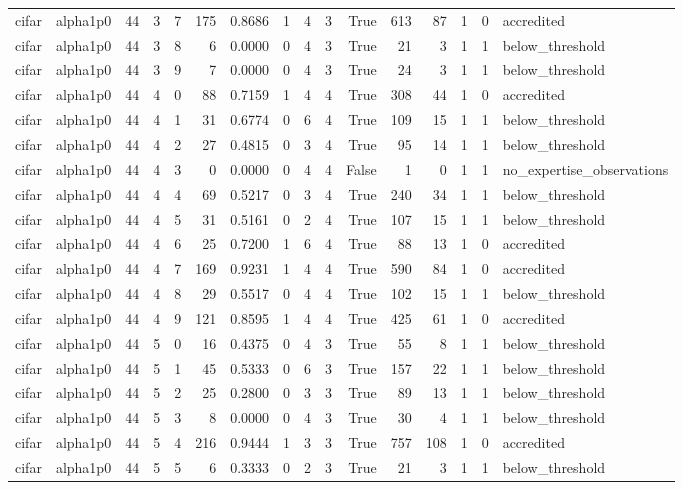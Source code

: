 \begin{tabular}{llrrrrrrrrrrrrrl}
cifar & alpha1p0 & 44 & 3 & 7 & 175 & 0.8686 & 1 & 4 & 3 & True & 613 & 87 & 1 & 0 & accredited \\
cifar & alpha1p0 & 44 & 3 & 8 & 6 & 0.0000 & 0 & 4 & 3 & True & 21 & 3 & 1 & 1 & below\_threshold \\
cifar & alpha1p0 & 44 & 3 & 9 & 7 & 0.0000 & 0 & 4 & 3 & True & 24 & 3 & 1 & 1 & below\_threshold \\
cifar & alpha1p0 & 44 & 4 & 0 & 88 & 0.7159 & 1 & 4 & 4 & True & 308 & 44 & 1 & 0 & accredited \\
cifar & alpha1p0 & 44 & 4 & 1 & 31 & 0.6774 & 0 & 6 & 4 & True & 109 & 15 & 1 & 1 & below\_threshold \\
cifar & alpha1p0 & 44 & 4 & 2 & 27 & 0.4815 & 0 & 3 & 4 & True & 95 & 14 & 1 & 1 & below\_threshold \\
cifar & alpha1p0 & 44 & 4 & 3 & 0 & 0.0000 & 0 & 4 & 4 & False & 1 & 0 & 1 & 1 & no\_expertise\_observations \\
cifar & alpha1p0 & 44 & 4 & 4 & 69 & 0.5217 & 0 & 3 & 4 & True & 240 & 34 & 1 & 1 & below\_threshold \\
cifar & alpha1p0 & 44 & 4 & 5 & 31 & 0.5161 & 0 & 2 & 4 & True & 107 & 15 & 1 & 1 & below\_threshold \\
cifar & alpha1p0 & 44 & 4 & 6 & 25 & 0.7200 & 1 & 6 & 4 & True & 88 & 13 & 1 & 0 & accredited \\
cifar & alpha1p0 & 44 & 4 & 7 & 169 & 0.9231 & 1 & 4 & 4 & True & 590 & 84 & 1 & 0 & accredited \\
cifar & alpha1p0 & 44 & 4 & 8 & 29 & 0.5517 & 0 & 4 & 4 & True & 102 & 15 & 1 & 1 & below\_threshold \\
cifar & alpha1p0 & 44 & 4 & 9 & 121 & 0.8595 & 1 & 4 & 4 & True & 425 & 61 & 1 & 0 & accredited \\
cifar & alpha1p0 & 44 & 5 & 0 & 16 & 0.4375 & 0 & 4 & 3 & True & 55 & 8 & 1 & 1 & below\_threshold \\
cifar & alpha1p0 & 44 & 5 & 1 & 45 & 0.5333 & 0 & 6 & 3 & True & 157 & 22 & 1 & 1 & below\_threshold \\
cifar & alpha1p0 & 44 & 5 & 2 & 25 & 0.2800 & 0 & 3 & 3 & True & 89 & 13 & 1 & 1 & below\_threshold \\
cifar & alpha1p0 & 44 & 5 & 3 & 8 & 0.0000 & 0 & 4 & 3 & True & 30 & 4 & 1 & 1 & below\_threshold \\
cifar & alpha1p0 & 44 & 5 & 4 & 216 & 0.9444 & 1 & 3 & 3 & True & 757 & 108 & 1 & 0 & accredited \\
cifar & alpha1p0 & 44 & 5 & 5 & 6 & 0.3333 & 0 & 2 & 3 & True & 21 & 3 & 1 & 1 & below\_threshold \\

\end{tabular}
